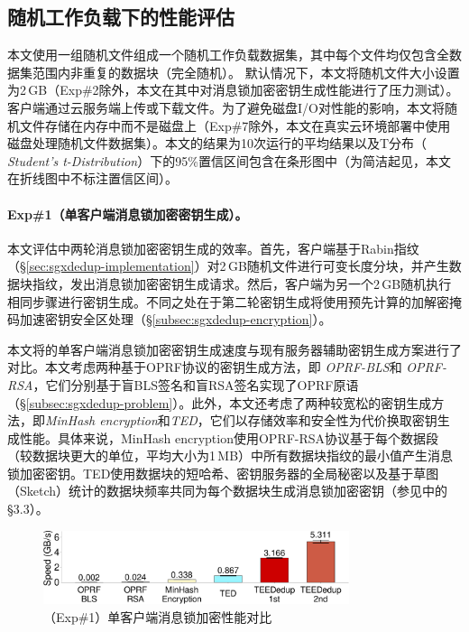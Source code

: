 \subsection{随机工作负载下的性能评估}
\label{subsec:sgxdedup-synthetic}

本文使用一组随机文件组成一个随机工作负载数据集，其中每个文件均仅包含全数据集范围内非重复的数据块（完全随机）。 默认情况下，本文将随机文件大小设置为2\,GB（Exp\#2除外，本文在其中对消息锁加密密钥生成性能进行了压力测试）。 客户端通过云服务端上传或下载文件。为了避免磁盘I/O对性能的影响，本文将随机文件存储在内存中而不是磁盘上（Exp\#7除外，本文在真实云环境部署中使用磁盘处理随机文件数据集）。本文的结果为10次运行的平均结果以及T分布（\textit{ Student's t-Distribution}）下的95\%置信区间包含在条形图中（为简洁起见，本文在折线图中不标注置信区间）。

\paragraph*{Exp\#1（单客户端消息锁加密密钥生成）。}本文评估\sysnameS 中两轮消息锁加密密钥生成的效率。首先，客户端基于Rabin指纹（\S\ref{sec:sgxdedup-implementation}）对2\,GB随机文件进行可变长度分块，并产生数据块指纹，发出消息锁加密密钥生成请求。然后，客户端为另一个2\,GB随机执行相同步骤进行密钥生成。不同之处在于第二轮密钥生成将使用预先计算的加解密掩码加速密钥安全区处理（\S\ref{subsec:sgxdedup-encryption}）。

本文将\sysnameS 的单客户端消息锁加密密钥生成速度与现有服务器辅助密钥生成方案进行了对比。本文考虑两种基于OPRF协议的密钥生成方法，即 \textit{OPRF-BLS}\cite{armknecht2015transparent}和\textit{ OPRF-RSA}\cite{bellare2013DupLESS}，它们分别基于盲BLS签名和盲RSA签名实现了OPRF原语（\S\ref{subsec:sgxdedup-problem}）。此外，本文还考虑了两种较宽松的密钥生成方法，即\textit{MinHash encryption}\cite{qin17}和\textit{TED}\cite{li2020TED}，它们以存储效率和安全性为代价换取密钥生成性能。具体来说，MinHash encryption使用OPRF-RSA协议基于每个数据段（较数据块更大的单位，平均大小为1\,MB）中所有数据块指纹的最小值产生消息锁加密密钥。TED使用数据块的短哈希、密钥服务器的全局秘密以及基于草图（Sketch）统计的数据块频率共同为每个数据块生成消息锁加密密钥（参见\cite{li2020TED}中的\S3.3）。

\begin{figure}[!htb]
    \centering
    \includegraphics[width=0.8\textwidth]{pic/sgxdedup/expa2_keyGenPerformance.pdf}
    \caption{（Exp\#1）单客户端消息锁加密性能对比}
    \label{fig:sgxdedup-keygen-comparison}
\end{figure}

